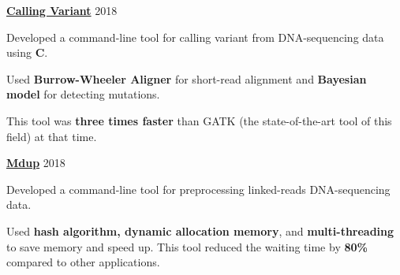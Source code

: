 \begin{cventries} %
  \cvsimpleentry
    {\href{https://github.com/tuan-tt/calling_variant}{\textbf{Calling Variant}}} %
    {2018} %
    {
      \begin{cvitems} %
        \item {Developed a command-line tool for calling variant from DNA-sequencing data using \textbf{C}.}
        \item {Used \textbf{Burrow-Wheeler Aligner} for short-read alignment and \textbf{Bayesian model} for detecting mutations.}
        \item {This tool was \textbf{three times faster} than GATK (the state-of-the-art tool of this field) at that time.}
      \end{cvitems}
    }

  \cvsimpleentry
    {\href{https://github.com/kspham/mdup}{\textbf{Mdup}}} %
    {2018} %
    {
      \begin{cvitems} %
        \item {Developed a command-line tool for preprocessing linked-reads DNA-sequencing data.}
        \item {Used \textbf{hash algorithm, dynamic allocation memory}, and \textbf{multi-threading} to save memory and speed up. This tool reduced the waiting time by \textbf{80\%} compared to other applications.}
      \end{cvitems}
    }

\end{cventries}
